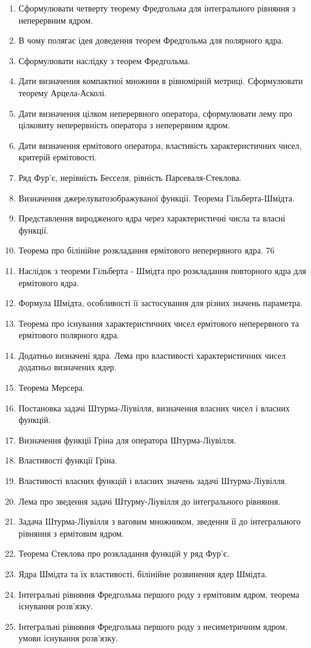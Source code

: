 \begin{enumerate}
\item Сформулювати четверту теорему Фредгольма для інтегрального рівняння з неперервним ядром.
\item В чому полягає ідея доведення теорем Фредгольма для полярного ядра.
\item Сформулювати наслідку з теорем Фредгольма.
\item Дати визначення компактної множини в рівномірній метриці. Сформулювати теорему Арцела-Асколі.
\item Дати визначення цілком неперервного оператора, сформулювати лему про цілковиту неперервність оператора з неперервним ядром.
\item Дати визначення ермітового оператора, властивість характеристичних чисел, критерій ермітовості.
\item Ряд Фур’є, нерівність Бесселя, рівність Парсеваля-Стеклова.
\item Визначення джерелуватозображуваної функції. Теорема Гільберта-Шмідта.
\item Представлення виродженого ядра через характеристичні числа та власні функції.
\item Теорема про білінійне розкладання ермітового неперервного ядра.
76
\item Наслідок з теореми Гільберта - Шмідта про розкладання повторного ядра для ермітового ядра.
\item Формула Шмідта, особливості її застосування для різних значень параметра.
\item Теорема про існування характеристичних чисел ермітового неперервного та ермітового полярного ядра.
\item Додатньо визначені ядра. Лема про властивості характеристичних чисел додатньо визначених ядер.
\item Теорема Мерсера.
\item Постановка задачі Штурма-Ліувілля, визначення власних чисел і власних функцій.
\item Визначення функції Гріна для оператора Штурма-Ліувілля.
\item Властивості функції Гріна.
\item Властивості власних функцій і власних значень задачі Штурма-Ліувілля.
\item Лема про зведення задачі Штурму-Ліувілля до інтегрального рівняння.
\item Задача Штурма-Ліувілля з ваговим множником, зведення її до інтегрального рівняння з ермітовим ядром.
\item Теорема Стеклова про розкладання функцій у ряд Фур'є.
\item Ядра Шмідта та їх властивості, білінійне розвинення ядер Шмідта.
\item Інтегральні рівняння Фредгольма першого роду з ермітовим ядром, теорема існування розв’язку.
\item Інтегральні рівняння Фредгольма першого роду з несиметричним ядром, умови існування розв’язку.
\end{enumerate}